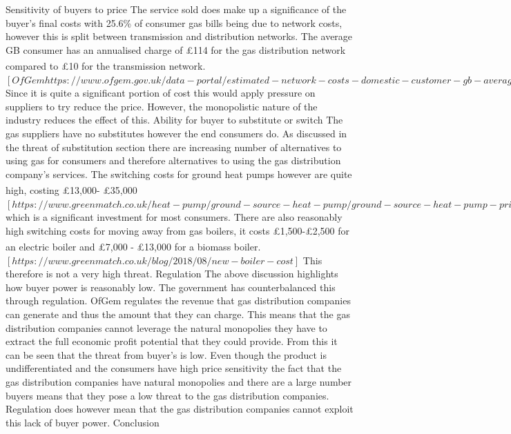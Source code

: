 \documentclass[11pt]{article}		%
\newcommand{\supercite}[1]{\textsuperscript{\cite{#1}}}		%
\begin{document}
                Sensitivity of buyers to price
                The service sold does make up a significance of the buyer’s final costs with 25.6\% of consumer gas bills being due to network costs, however this is split between transmission and distribution networks. The average GB consumer has an annualised charge of £114 for the gas distribution network compared to £10 for the transmission network.\supercite{gas_cost}$[  OfGem https://www.ofgem.gov.uk/data-portal/estimated-network-costs-domestic-customer-gb-average]$  Since it is quite a significant portion of cost this would apply pressure on suppliers to try reduce the price. However, the monopolistic nature of the industry reduces the effect of this.
                Ability for buyer to substitute or switch
                The gas suppliers have no substitutes however the end consumers do. As discussed in the threat of substitution section there are increasing number of alternatives to using gas for consumers and therefore alternatives to using the gas distribution company’s services. The switching costs for ground heat pumps however are quite high, costing £13,000- £35,000\supercite{Heat_Pump_Cost} $[  https://www.greenmatch.co.uk/heat-pump/ground-source-heat-pump/ground-source-heat-pump-prices]$ which is a significant investment for most consumers. There are also reasonably high switching costs for moving away from gas boilers, it costs £1,500-£2,500 for an electric boiler and £7,000 - £13,000 for a biomass boiler.\supercite{boiler_cost} $[  https://www.greenmatch.co.uk/blog/2018/08/new-boiler-cost]$  This therefore is not a very high threat.
                Regulation
                The above discussion highlights how buyer power is reasonably low. The government has counterbalanced this through regulation. OfGem regulates the revenue that gas distribution companies can generate and thus the amount that they can charge. This means that the gas distribution companies cannot leverage the natural monopolies they have to extract the full economic profit potential that they could provide.
                From this it can be seen that the threat from buyer’s is low. Even though the product is undifferentiated and the consumers have high price sensitivity the fact that the gas distribution companies have natural monopolies and there are a large number buyers means that they pose a low threat to the gas distribution companies. Regulation does however mean that the gas distribution companies cannot exploit this lack of buyer power.
                Conclusion
\end{document}

